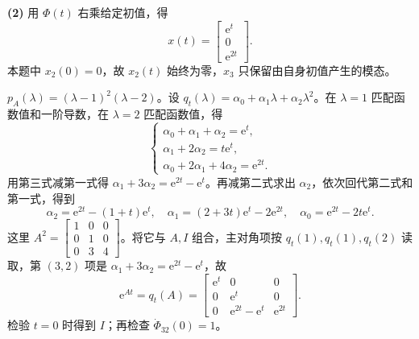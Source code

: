 \textbf{(2)} 用 $\Phi(t)$ 右乘给定初值，得
\[
x(t)=\begin{bmatrix}\mathrm e^t\\0\\\mathrm e^{2t}\end{bmatrix}.
\]
本题中 $x_2(0)=0$，故 $x_2(t)$ 始终为零，$x_3$ 只保留由自身初值产生的模态。



\sol $p_A(\lambda)=(\lambda-1)^2(\lambda-2)$。设 $q_t(\lambda)=\alpha_0+\alpha_1\lambda+\alpha_2\lambda^2$。在 $\lambda=1$ 匹配函数值和一阶导数，在 $\lambda=2$ 匹配函数值，得
\[
\begin{cases}
\alpha_0+\alpha_1+\alpha_2=\mathrm e^t,\\
\alpha_1+2\alpha_2=t\mathrm e^t,\\
\alpha_0+2\alpha_1+4\alpha_2=\mathrm e^{2t}.
\end{cases}
\]
用第三式减第一式得 $\alpha_1+3\alpha_2=\mathrm e^{2t}-\mathrm e^t$。再减第二式求出 $\alpha_2$，依次回代第二式和第一式，得到
\[
\alpha_2=\mathrm e^{2t}-(1+t)\mathrm e^t,\quad
\alpha_1=(2+3t)\mathrm e^t-2\mathrm e^{2t},\quad
\alpha_0=\mathrm e^{2t}-2t\mathrm e^t.
\]
这里 $A^2=\begin{bmatrix}1&0&0\\0&1&0\\0&3&4\end{bmatrix}$。将它与 $A,I$ 组合，主对角项按 $q_t(1),q_t(1),q_t(2)$ 读取，第 $(3,2)$ 项是 $\alpha_1+3\alpha_2=\mathrm e^{2t}-\mathrm e^t$，故
\[
\mathrm e^{At}=q_t(A)=\begin{bmatrix}
\mathrm e^t&0&0\\0&\mathrm e^t&0\\0&\mathrm e^{2t}-\mathrm e^t&\mathrm e^{2t}
\end{bmatrix}.
\]
检验 $t=0$ 时得到 $I$；再检查 $\dot\Phi_{32}(0)=1$。


